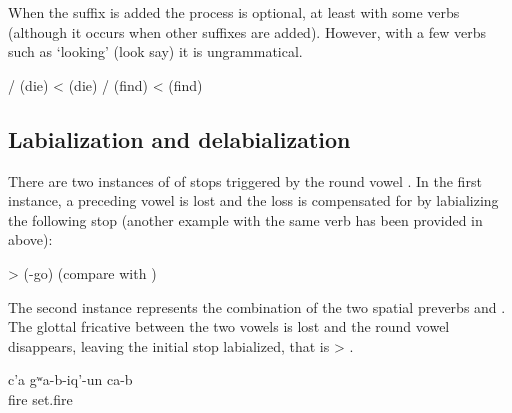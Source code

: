 When the  suffix is added the process is optional, at least with some verbs  (although it occurs when other suffixes are added). However, with a few verbs such as  `looking' (look say) it is ungrammatical.
%
\begin{exe}
	\ex	\label{ex:masdar palatalization phon}
	\begin{xlist}
		\ex	{}\slash{} (die) <  (die) 
		\ex	{}\slash{} (find) <  (find)
	\end{xlist}
\end{exe}



\subsection{Labialization and delabialization}
\label{ssec:Labialization and delabialization}

There are two instances of  of stops triggered by the round vowel . In the first instance, a preceding vowel is lost and the loss is compensated for by labializing the following stop (another example with the same verb has been provided in  above):
%
\begin{exe} \label{ex:insidephon2}
	\ex	{} >  \newline\hspace*{2em}(-go) (compare with )
\end{exe}

The second instance represents the combination of the two spatial preverbs   and  . The glottal fricative between the two vowels is lost and the round vowel disappears, leaving the initial stop labialized, that is  >  .
%
\begin{exe}
	\ex	\label{ex:She set up a phon}
	\gll	c'a	gʷa-b-iq'-un	ca-b\\
		fire	set.fire	 \\
	\glt	{}
\end{exe}

